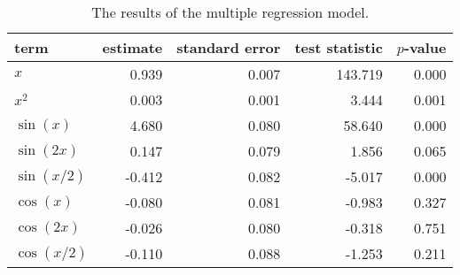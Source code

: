 \begin{table}[t]

\caption{\label{tab:multiple-regression}The results of the multiple regression model.}
\centering
\begin{tabular}{lrrrr}
\toprule
term & estimate & standard error & test statistic & \(p\)-value\\
\midrule
\(x\) & 0.939 & 0.007 & 143.719 & 0.000\\
\(x^2\) & 0.003 & 0.001 & 3.444 & 0.001\\
\(\sin(x)\) & 4.680 & 0.080 & 58.640 & 0.000\\
\(\sin(2x)\) & 0.147 & 0.079 & 1.856 & 0.065\\
\(\sin(x/2)\) & -0.412 & 0.082 & -5.017 & 0.000\\
\(\cos(x)\) & -0.080 & 0.081 & -0.983 & 0.327\\
\(\cos(2x)\) & -0.026 & 0.080 & -0.318 & 0.751\\
\(\cos(x/2)\) & -0.110 & 0.088 & -1.253 & 0.211\\
\bottomrule
\end{tabular}
\end{table}